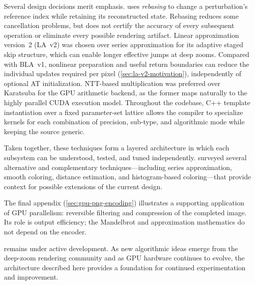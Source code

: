 Several design decisions merit emphasis. \FractalShark{} uses \emph{rebasing}
to change a perturbation's reference index while retaining its reconstructed state.
Rebasing reduces some cancellation problems, but does not certify the accuracy of
every subsequent operation or eliminate every possible rendering artifact.  Linear
approximation version~2 (LA~v2) was chosen over series approximation
for its adaptive staged skip structure, which can enable longer
effective jumps at deep zooms. Compared with BLA~v1, nonlinear
preparation and useful return boundaries can reduce the individual
updates required per pixel (\cref{sec:la-v2-motivation}), independently
of optional AT initialization. NTT-based multiplication was preferred over
Karatsuba for the GPU arithmetic backend, as the former maps naturally
to the highly parallel CUDA execution model.  Throughout the
codebase, C++ template instantiation over a fixed parameter-set
lattice allows the compiler to specialize kernels for each combination
of precision, sub-type, and algorithmic mode while keeping the source
generic.

Taken together, these techniques form a layered architecture in which
each subsystem can be understood, tested, and tuned independently.
 surveyed several alternative and
complementary techniques---including series approximation,
smooth coloring, distance estimation, and histogram-based coloring---that provide
context for possible extensions of the current design.

The final appendix (\cref{sec:gpu-png-encoding}) illustrates a supporting application
of GPU parallelism: reversible filtering and compression of the completed image.
Its role is output efficiency; the Mandelbrot and approximation mathematics do not
depend on the encoder.

\FractalShark{} remains under active development.  As new algorithmic
ideas emerge from the deep-zoom rendering community and as GPU
hardware continues to evolve, the architecture described here provides
a foundation for continued experimentation and improvement.
